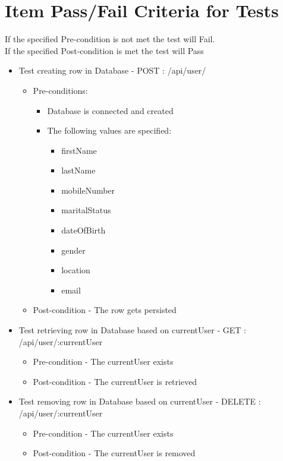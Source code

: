 \documentclass{article}
\begin{document}
\section{Item Pass/Fail Criteria for Tests}
If the specified Pre-condition is not met the test will Fail. \\
If the specified Post-condition is met the test will Pass
\begin{itemize}
\item Test creating row in Database - POST : /api/user/
	\begin{itemize}
	\item Pre-conditions:
		\begin{itemize}
		\item Database is connected and created
		\item The following values are specified:  
		\begin{itemize}
		\item firstName
  		\item lastName
  		\item mobileNumber 
  		\item maritalStatus 
  		\item dateOfBirth 
 		\item gender
  		\item location 
 		\item email
 		\end{itemize} 
		\end{itemize}
	\item Post-condition - The row gets persisted
	\end{itemize}
	
\item Test retrieving row in Database based on currentUser - GET : /api/user/:currentUser
	\begin{itemize}
	\item Pre-condition - The currentUser exists
	\item Post-condition - The currentUser is retrieved 
	\end{itemize}
	
\item Test removing row in Database based on currentUser - DELETE : /api/user/:currentUser
	\begin{itemize}
	\item Pre-condition - The currentUser exists
	\item Post-condition - The currentUser is removed 
	\end{itemize}	
\end{itemize}
\end{document}
